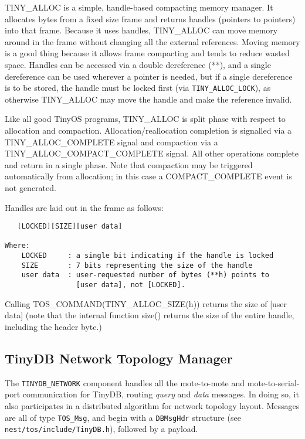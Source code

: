 \documentclass[11pt]{article}
\begin{document}
TINY\_ALLOC is a simple, handle-based compacting memory manager.  It
allocates bytes from a fixed size frame and returns handles (pointers
to pointers) into that frame.  Because it uses handles, TINY\_ALLOC can
move memory around in the frame without changing all the external
references.  Moving memory is a good thing because it allows frame
compacting and tends to reduce wasted space.  Handles can be accessed
via a double dereference (**), and a single dereference can be used
wherever a pointer is needed, but if a single dereference is to be
stored, the handle must be locked first (via {\tt TINY\_ALLOC\_LOCK}),
as otherwise TINY\_ALLOC may move the handle and make the reference invalid.

   Like all good TinyOS programs, TINY\_ALLOC is split phase with
respect to allocation and compaction.  Allocation/reallocation
completion is signalled via a TINY\_ALLOC\_COMPLETE signal and
compaction via a TINY\_ALLOC\_COMPACT\_COMPLETE signal.  All other
operations complete and return in a single phase. Note that compaction
may be triggered automatically from allocation; in this case a
COMPACT\_COMPLETE event is not generated.

Handles are laid out in the frame as follows:
\begin{verbatim}
   [LOCKED][SIZE][user data] 

Where: 
    LOCKED     : a single bit indicating if the handle is locked 
    SIZE       : 7 bits representing the size of the handle 
    user data  : user-requested number of bytes (**h) points to
                 [user data], not [LOCKED].
\end{verbatim}
   Calling TOS\_COMMAND(TINY\_ALLOC\_SIZE(h)) returns the size of [user
data] (note that the internal function size() returns the size of the
entire handle, including the header byte.)

\subsection{TinyDB Network Topology Manager}
\label{sec:tinydbnetwork}
The {\tt TINYDB\_NETWORK} component handles all the mote-to-mote and mote-to-serial-port
communication for TinyDB, routing {\em query} and {\em data} messages.
In doing so, it also participates in a distributed algorithm for
network topology layout.  Messages are all of type {\tt TOS\_Msg},
and begin with a {\tt DBMsgHdr} structure (see {\tt
nest/tos/include/TinyDB.h}), followed by a payload.
\end{document}
